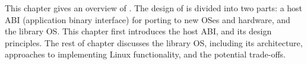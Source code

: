 This chapter gives an overview of \graphene{}.
The design of \graphene{} is divided into two parts:
a host ABI (application binary interface) for porting to new OSes and hardware,
and the \graphene{} library OS. %
This chapter first introduces the host ABI, and its design principles.
The rest of chapter
discusses the library OS, including its architecture,
approaches to implementing Linux functionality,
and the potential trade-offs. %


